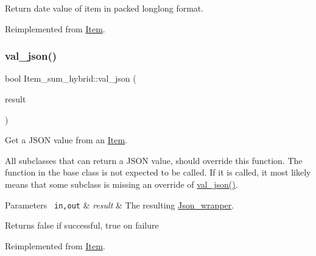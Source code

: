 Return date value of item in packed longlong format. 

Reimplemented from \mbox{\hyperlink{classItem_a9174217a46706eb2db74689b5365c4a5}{Item}}.

\mbox{\label{classItem__sum__hybrid_a465c42375cab52fc5feabd0268d2bced}} 
\subsubsection{\texorpdfstring{val\+\_\+json()}{val\_json()}}
{\footnotesize\ttfamily bool Item\+\_\+sum\+\_\+hybrid\+::val\+\_\+json (\begin{DoxyParamCaption}\item[{\mbox{\hyperlink{classJson__wrapper}{Json\+\_\+wrapper}} $\ast$}]{result }\end{DoxyParamCaption})\hspace{0.3cm}{\ttfamily [virtual]}}

Get a J\+S\+ON value from an \mbox{\hyperlink{classItem}{Item}}.

All subclasses that can return a J\+S\+ON value, should override this function. The function in the base class is not expected to be called. If it is called, it most likely means that some subclass is missing an override of \mbox{\hyperlink{classItem__sum__hybrid_a465c42375cab52fc5feabd0268d2bced}{val\+\_\+json()}}.


\begin{DoxyParams}[1]{Parameters}
\mbox{\texttt{ in,out}}  & {\em result} & The resulting \mbox{\hyperlink{classJson__wrapper}{Json\+\_\+wrapper}}.\\
\hline
\end{DoxyParams}
\begin{DoxyReturn}{Returns}
false if successful, true on failure 
\end{DoxyReturn}


Reimplemented from \mbox{\hyperlink{classItem_a57e763fcde2d0a819d21e31c59611290}{Item}}.

\mbox{\label{classItem__sum__hybrid_a8de5e52f6be6c1d1e58a6f86b24c073f}} 
